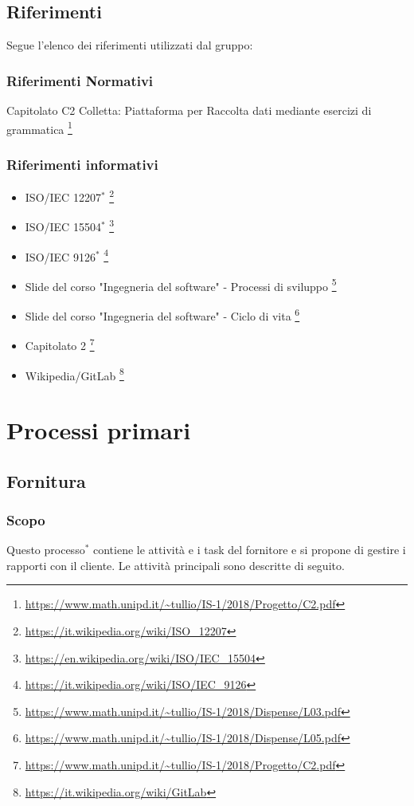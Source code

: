 \documentclass[11pt,a4paper]{article}
\begin{document}
{	\subsection{Riferimenti}
	Segue l'elenco dei riferimenti utilizzati dal gruppo:
	\subsubsection{Riferimenti Normativi}
Capitolato C2 Colletta: Piattaforma per Raccolta dati mediante esercizi di grammatica
\footnote{\url{https://www.math.unipd.it/~tullio/IS-1/2018/Progetto/C2.pdf}}

	\subsubsection{Riferimenti informativi}
	\begin{itemize}
		\item ISO/IEC 12207$^*$
		\footnote{\url {https://it.wikipedia.org/wiki/ISO\_12207}}
		
		\item ISO/IEC 15504$^*$
		\footnote{\url {https://en.wikipedia.org/wiki/ISO/IEC\_15504}}
		\item ISO/IEC 9126$^*$
		\footnote{\url {https://it.wikipedia.org/wiki/ISO/IEC\_9126}}
		
	\item Slide del corso "Ingegneria del software" - Processi di sviluppo 
		\footnote{\url{https://www.math.unipd.it/~tullio/IS-1/2018/Dispense/L03.pdf}}
		\item Slide del corso "Ingegneria del software" - Ciclo di vita 
		\footnote{\url{https://www.math.unipd.it/~tullio/IS-1/2018/Dispense/L05.pdf}}
		\item Capitolato 2
		\footnote{\url{https://www.math.unipd.it/~tullio/IS-1/2018/Progetto/C2.pdf}}
		\item Wikipedia/GitLab
		\footnote{\url {https://it.wikipedia.org/wiki/GitLab}}
	\end{itemize}					
\newpage

	
	\section{Processi primari}
	\subsection{Fornitura}
	\subsubsection{Scopo}
	Questo processo$^*$ contiene le attività e i task del fornitore e si propone di gestire i rapporti con il cliente. Le attività principali sono descritte di seguito.
	
}
\end{document}
